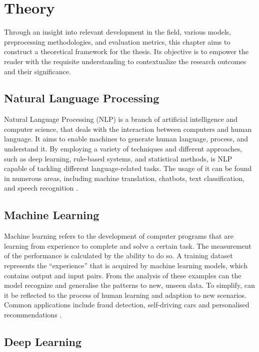 \chapter{Theory}

Through an insight into relevant development in the field, various models, preprocessing methodologies, and evaluation metrics, this chapter aims to construct a theoretical framework for the thesis. Its objective is to empower the reader with the requisite understanding to contextualize the research outcomes and their significance.

\section{Natural Language Processing}

Natural Language Processing (NLP) is a branch of artificial intelligence and computer science, that deals with the interaction between computers and human language. It aims to enable machines to generate human language, process, and understand it. By employing a variety of techniques and different approaches, such as deep learning, rule-based systems, and statistical methods, is NLP capable of tackling different language-related tasks. The usage of it can be found in numerous areas, including machine translation, chatbots, text classification, and speech recognition \citep{helland_tackling_2023}.

\section{Machine Learning}

Machine learning refers to the development of computer programs that are learning from experience to complete and solve a certain task. The measurement of the performance is calculated by the ability to do so. A training dataset represents the “experience” that is acquired by machine learning models, which contains output and input pairs. From the analysis of these examples can the model recognize and generalise the patterns to new, unseen data. To simplify, can it be reflected to the process of human learning and adaption to new scenarios. Common applications include fraud detection, self-driving cars and personalised recommendations \citep{helland_tackling_2023}.

\section{Deep Learning}

